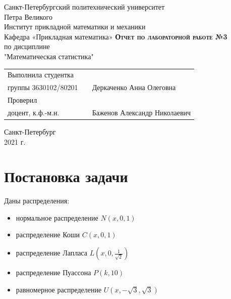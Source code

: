 \documentclass[12pt,a4paper]{article}
\begin{document}
    \begin{titlepage}
        \begin{center}
            \large
            Санкт-Петербургский политехнический университет\\Петра Великого\\
            \vspace{0.5cm}
            Институт прикладной математики и механики\\
            \vspace{0.25cm}
            Кафедра «Прикладная математика»
            \vfill
            \textsc{\LARGE\textbf{Отчет по лабораторной работе №3}}\\[5mm]
            \Large
            по дисциплине\\"Математическая статистика"
        \end{center}
        \vfill
        \begin{tabular}{l p{} l}
            Выполнила студентка\\группы 3630102/80201 && Деркаченко Анна Олеговна
            \vspace{0.25cm}
            \\Проверил\\доцент, к.ф.-м.н. && Баженов Александр Николаевич
        \end{tabular}
        \vfill
        \begin{center}
            Санкт-Петербург\\2021 г.
        \end{center}
    \end{titlepage}

\newpage
\begin{center}
    \tableofcontents
    \setcounter{page}{2}
\end{center}
\newpage
\begin{center}
    \listoffigures
\end{center}

\newpage
\section{Постановка задачи}
Даны распределения:
\begin{itemize}
    \item нормальное распределение $N(x,0,1)$
    \item распределение Коши $C(x,0,1)$
    \item распределение Лапласа $L(x,0,\frac{1}{\sqrt{2}})$
    \item распределение Пуассона $P(k,10)$
    \item равномерное распределение $U(x,-\sqrt{3},\sqrt{3})$
\end{itemize}
\end{document}
